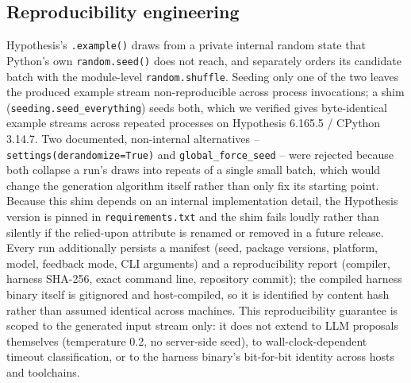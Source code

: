 \subsection{Reproducibility engineering}
Hypothesis's \texttt{.example()} draws from a private internal random state
that Python's own \texttt{random.seed()} does not reach, and separately
orders its candidate batch with the module-level \texttt{random.shuffle}.
Seeding only one of the two leaves the produced example stream
non-reproducible across process invocations; a shim
(\texttt{seeding.seed\_everything}) seeds both, which we verified gives
byte-identical example streams across repeated processes on Hypothesis
6.165.5 / CPython 3.14.7. Two documented, non-internal alternatives --
\texttt{settings(derandomize=True)} and \texttt{global\_force\_seed} -- were
rejected because both collapse a run's draws into repeats of a single small
batch, which would change the generation algorithm itself rather than only
fix its starting point. Because this shim depends on an internal
implementation detail, the Hypothesis version is pinned in
\texttt{requirements.txt} and the shim fails loudly rather than silently if
the relied-upon attribute is renamed or removed in a future release. Every
run additionally persists a manifest (seed, package versions, platform,
model, feedback mode, CLI arguments) and a reproducibility report (compiler,
harness SHA-256, exact command line, repository commit); the compiled
harness binary itself is gitignored and host-compiled, so it is identified
by content hash rather than assumed identical across machines. This
reproducibility guarantee is scoped to the generated input stream only: it
does not extend to LLM proposals themselves (temperature 0.2, no server-side
seed), to wall-clock-dependent timeout classification, or to the harness
binary's bit-for-bit identity across hosts and toolchains.

